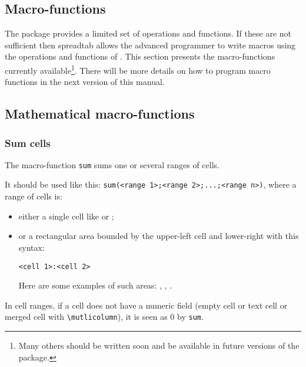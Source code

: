 \documentclass[a4paper,10pt]{article}
\newcommand\verbinline[1][]{\lstinline[breaklines=false,basicstyle=\normalsize\ttfamily,#1]}
\newcommand\ST{\textsf{spreadtab}\xspace}
\newcommand\falseverb[1]{\texttt{\detokenize{#1}}}
\begin{document}
\begin{<table environment>}
\section{Macro-functions}
The \falseverb{fp} package provides a limited set of operations and functions. If these are not sufficient then \ST allows the advanced programmer to write macros using the operations and functions of \falseverb{fp}. This section presents the macro-functions currently available\footnote{Many others should be written soon and be available in future versions of the package.}. There will be more details on how to program macro functions in the next version of this manual.

\subsection{Mathematical macro-functions}
\subsubsection{Sum cells}
The macro-function \verbinline=sum= sums one or several ranges of cells.

It should be used like this: \verbinline=sum(<range 1>;<range 2>;...;<range n>)=, where a range of cells is:
\begin{itemize}
	\item either a single cell like \falseverb{a1} or \falseverb{[2,1]};
	\item or a rectangular area bounded by the upper-left cell and lower-right with this syntax:\par{\centering\verb=<cell 1>:<cell 2>=\par}
	Here are some examples of such areas: \falseverb{a2:d5}, \falseverb{[-1,-1]:[2,3]}, \falseverb{b4:[5,1]}.
\end{itemize}
In cell ranges, if a cell does not have a numeric field (empty cell or text cell or merged cell with \verbinline-\mutlicolumn-), it is seen as 0 by \verbinline-sum-.


\end{<table environment>}
\end{document}
